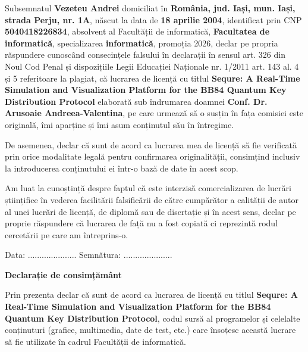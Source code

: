 \documentclass[12pt, a4paper]{article}
\begin{document}
Subsemnatul \textbf{Vezeteu Andrei} domiciliat în \textbf{România, jud. Iași, mun. Iași, strada Perju, nr. 1A}, născut la data de \textbf{18 aprilie 2004}, identificat prin CNP \textbf{5040418226834}, absolvent al Facultății de informatică, \textbf{Facultatea de informatică}, specializarea \textbf{informatică}, promoția 2026, declar pe propria răspundere cunoscând consecințele falsului în declarații în sensul art. 326 din Noul Cod Penal și dispozițiile Legii Educației Naționale nr. 1/2011 art. 143 al. 4 și 5 referitoare la plagiat, că lucrarea de licență cu titlul \textbf{Sequre: A Real-Time Simulation and
Visualization Platform for the BB84
Quantum Key Distribution Protocol} elaborată sub îndrumarea doamnei \textbf{Conf. Dr. Arusoaie Andreea-Valentina}, pe care urmează să o susțin în fața comisiei este originală, îmi aparține și îmi asum conținutul său în întregime.

De asemenea, declar că sunt de acord ca lucrarea mea de licență să fie verificată prin orice modalitate legală pentru confirmarea originalității, consimțind inclusiv la introducerea conținutului ei într-o bază de date în acest scop.

Am luat la cunoștință despre faptul că este interzisă comercializarea de lucrări științifice în vederea facilitării falsificării de către cumpărător a calității de autor al unei lucrări de licență, de diplomă sau de disertație și în acest sens, declar pe proprie răspundere că lucrarea de față nu a fost copiată ci reprezintă rodul cercetării pe care am întreprins-o.

\begin{flushright}
    Data: ..................... \hspace{6cm} Semnătura: .....................
\end{flushright}

\vspace*{\fill}
\pagebreak


\vspace*{\fill}
\begin{center}
    \large
    \textbf{Declarație de consimțământ}
\end{center}

Prin prezenta declar că sunt de acord ca lucrarea de licență cu titlul \textbf{Sequre: A Real-Time Simulation and
Visualization Platform for the BB84
Quantum Key Distribution Protocol}, codul sursă al programelor și celelalte conținuturi (grafice, multimedia, date de test, etc.) care însoțesc această lucrare să fie utilizate în cadrul Facultății de informatică.
\end{document}
